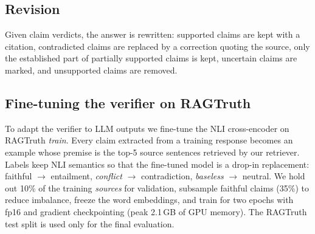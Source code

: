 \subsection{Revision}
Given claim verdicts, the answer is rewritten: supported claims are kept with a citation, contradicted claims are replaced by a correction quoting the source, only the established part of partially supported claims is kept, uncertain claims are marked, and unsupported claims are removed.

\subsection{Fine-tuning the verifier on RAGTruth}
To adapt the verifier to LLM outputs we fine-tune the NLI cross-encoder on RAGTruth \emph{train}.
Every claim extracted from a training response becomes an example whose premise is the top-5 source sentences retrieved by our retriever.
Labels keep NLI semantics so that the fine-tuned model is a drop-in replacement: faithful $\rightarrow$ entailment, \emph{conflict} $\rightarrow$ contradiction, \emph{baseless} $\rightarrow$ neutral.
We hold out 10\% of the training \emph{sources} for validation, subsample faithful claims (35\%) to reduce imbalance, freeze the word embeddings, and train for two epochs with fp16 and gradient checkpointing (peak 2.1\,GB of GPU memory).
The RAGTruth test split is used only for the final evaluation.
